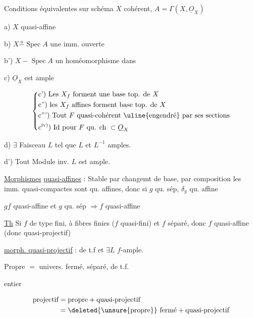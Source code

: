 Conditions équivalentes sur schéma $X$ cohérent, $A=\Gamma(X,\underline O_X)$

a) $X$ quasi-affine

b) $X\overset{u}{\mathrel{-}}\operatorname{Spec}A$ une imm. ouverte

b') $X\mathrel{-}\operatorname{Spec}A$ un homéomorphisme dans

c) $\underline O_X$ est ample

\[
\left\{\begin{aligned}
 &\text{c') Les }X_f\text{ forment une base top. de }X\\
 &\text{c'') les }X_f\text{ affines forment base top. de }X\\
 &\text{c''') Tout } F\text{ quasi-cohérent \uline{engendré} par ses sections}\\
 &c^{\mathrm{iv})})\ \text{Id pour }F\text{ qu. ch }\subset\underline O_X
\end{aligned}\right.
\]

d) $\exists$ Faisceau   $L$ tel que $L$ et $L^{-1}$ amples.

d') Tout Module inv. $L$ est ample.

\uline{Morphismes} \uline{quasi-affines} : Stable par changemt de base, par composition les imm. quasi-compactes sont qu. affines, donc si $g$ qu. sép, $\delta_g$ qu. affine

$gf$ quasi-affine et $g$ qu. sép $\Longrightarrow f$ quasi-affine

\uline{Th} Si $f$ de type fini,  à fibres finies ($f$ quasi-fini) et $f$ séparé, donc $f$ quasi-affine (donc quasi-projectif)

\uline{morph. quasi-projectif} : de t.f et $\exists L$ $f$-ample.

Propre $={}$ univers. fermé, séparé, de t.f.

entier

\[
\begin{aligned}\text{projectif}&=\text{propre}+\text{quasi-projectif}\\
 &=\deleted{\unsure{\text{propre}}}\ \text{fermé}+\text{quasi-projectif}
\end{aligned}
\]

